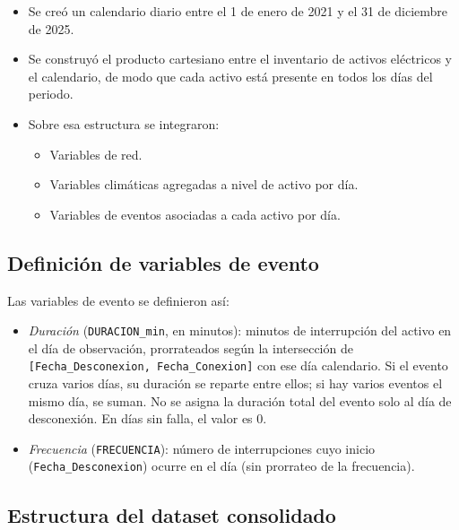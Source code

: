 \begin{itemize}
    \item Se creó un calendario diario entre el 1 de enero de 2021 y el 31 de diciembre de 2025.
    
    \item Se construyó el producto cartesiano entre el inventario de activos eléctricos y el calendario, de modo que cada activo está presente en todos los días del periodo.
    
    \item Sobre esa estructura se integraron:
    \begin{itemize}
        \item Variables de red.
        \item Variables climáticas agregadas a nivel de activo por día.
        \item Variables de eventos asociadas a cada activo por día.
    \end{itemize}

\end{itemize}

\subsection{Definición de variables de evento}

Las variables de evento se definieron así:

\begin{itemize}
    \item \textit{Duración} (\texttt{DURACION\_min}, en minutos): minutos de interrupción del activo en el día de observación, prorrateados según la intersección de \texttt{[Fecha\_Desconexion, Fecha\_Conexion]} con ese día calendario. Si el evento cruza varios días, su duración se reparte entre ellos; si hay varios eventos el mismo día, se suman. No se asigna la duración total del evento solo al día de desconexión. En días sin falla, el valor es $0$.
    
    \item \textit{Frecuencia} (\texttt{FRECUENCIA}): número de interrupciones cuyo inicio (\texttt{Fecha\_Desconexion}) ocurre en el día (sin prorrateo de la frecuencia).
\end{itemize}

\subsection{Estructura del dataset consolidado}

